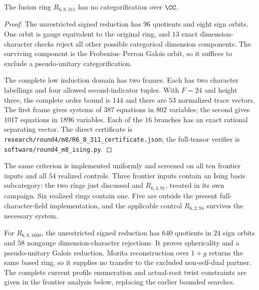 \begin{theorem}
\label{thm:round4-311}
The fusion ring $R_{6,8,311}$ has no categorification over $\CC$.
\end{theorem}
\begin{proof}
The unrestricted signed reduction has $96$ quotients and eight sign
orbits.  One orbit is gauge equivalent to the original ring, and $13$
exact dimension-character checks reject all other possible categorical
dimension components.  The surviving component is the
Frobenius--Perron Galois orbit, so it suffices to exclude a
pseudo-unitary categorification.

The complete low induction domain has two frames.  Each has two
character labellings and four allowed second-indicator tuples.  With
$F=24$ and height three, the complete order bound is $144$ and there are
$53$ normalized trace vectors.  The first frame gives systems of $387$
equations in $802$ variables; the second gives $1017$ equations in
$1896$ variables.  Each of the $16$ branches has an exact rational
separating vector.  The direct certificate is
\texttt{research/round4/m8/R6\_8\_311\_certificate.json}; the
full-tensor verifier is
\texttt{software/round4\_m8\_ising.py}.
\end{proof}

The same criterion is implemented uniformly and screened on all ten
frontier inputs and all $54$ realized controls.  Three frontier inputs
contain an Ising basis subcategory: the two rings just discussed and
$R_{6,4,91}$, treated in its own campaign.  Six realized rings contain
one.  Five are outside the present full-character-field implementation,
and the applicable control $R_{6,2,94}$ survives the necessary system.

For $R_{6,8,1660}$, the unrestricted signed reduction has $640$
quotients in $24$ sign orbits and $58$ nongauge dimension-character
rejections. It proves sphericality and a pseudo-unitary Galois reduction.
Morita reconstruction over $1+g$ returns the same based ring, so it
supplies no transfer to the excluded non-self-dual partner. The complete
current profile enumeration and actual-root twist constraints are given
in the frontier analysis below, replacing the earlier bounded searches.
